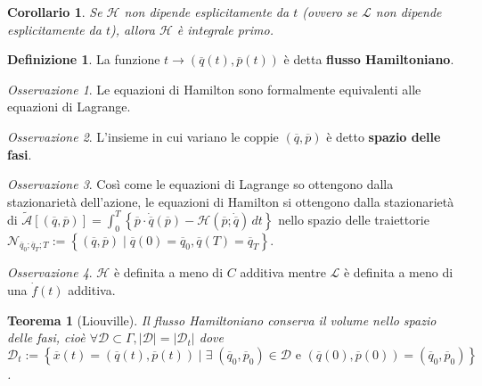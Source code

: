 \documentclass{book}
\theoremstyle{plain}
\newtheorem{teo}{Teorema}[chapter]
\theoremstyle{plain}
\theoremstyle{plain}
\theoremstyle{plain}
\newtheorem*{cor}{Corollario}
\theoremstyle{plain}
\theoremstyle{definition}
\newtheorem{defi}{Definizione}[chapter]
\theoremstyle{remark}
\newtheorem*{oss}{Osservazione}
\theoremstyle{definition}
\begin{document}
\begin{cor}
    Se $\mathcal{H}$ non dipende esplicitamente da $t$ (ovvero se $\mathcal{L}$ non dipende esplicitamente da $t$), allora $\mathcal{H}$ è integrale primo.
\end{cor}

\begin{defi}
     La funzione $t\to (\overline{q}(t),\overline{p}(t))$ è detta \textbf{flusso Hamiltoniano}.
\end{defi}

\begin{oss}
     Le equazioni di Hamilton sono formalmente equivalenti alle equazioni di Lagrange.
\end{oss}

\begin{oss}
     L'insieme in cui variano le coppie $(\overline{q},\overline{p})$ è detto \textbf{spazio delle fasi}.
\end{oss}

\begin{oss}
    Così come le equazioni di Lagrange so ottengono dalla stazionarietà dell'azione, le equazioni di Hamilton si ottengono dalla stazionarietà di $\mathcal{\widetilde{A}}\left[(\overline{q},\overline{p})\right]=\int_0^T\left\{\overline{p}\cdot\dot{\overline{q}}(\overline{p}) - \mathcal{H}(\overline{p};\dot{\overline{q}})\,dt\right\}$ nello spazio delle traiettorie $\mathcal{N}_{\overline{q}_0;\overline{q}_T;T}:=\left\{(\overline{q},\overline{p}) \; | \; \overline{q}(0)=\overline{q}_0, \overline{q}(T)=\overline{q}_T\right\}$.
\end{oss}

\begin{oss}
    $\mathcal{H}$ è definita a meno di $C$ additiva mentre $\mathcal{L}$ è definita a meno di una $\dot{f}(t)$ additiva.
\end{oss}

\begin{teo}[Liouville]
    Il flusso Hamiltoniano conserva il volume nello spazio delle fasi, cioè $\forall \mathcal{D}\subset\Gamma, |\mathcal{D}|=|\mathcal{D}_t|$ dove $\mathcal{D}_t:=\left\{\overline{x}(t)=(\overline{q}(t),\overline{p}(t)) \; | \; \exists \; (\overline{q}_0,\overline{p}_0)\in \mathcal{D} \text{ e } (\overline{q}(0),\overline{p}(0))=(\overline{q}_0,\overline{p}_0)\right\}$.
\end{teo}
\end{document}
